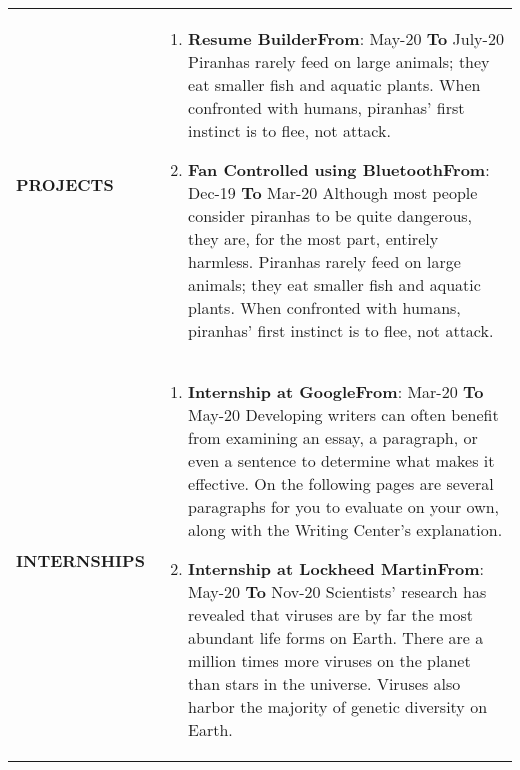 \documentclass{article}
\begin{document}
{\begin{longtable}{ p{3.5cm}|p{13.5cm} }
\\

{\textbf{\uppercase{Projects}}}&

\begin{enumerate}
	\item {\textbf{Resume Builder}}\hfill {\textbf{From}}: May-20 {\textbf{To}} July-20\newline
	Piranhas rarely feed on large animals; they eat smaller fish and aquatic plants. When confronted with humans, piranhas' first instinct is to flee, not attack. 
	\item {\textbf{Fan Controlled using Bluetooth}}\hfill {\textbf{From}}: Dec-19 {\textbf{To}} Mar-20\newline
	Although most people consider piranhas to be quite dangerous, they are, for the most part, entirely harmless. Piranhas rarely feed on large animals; they eat smaller fish and aquatic plants. When confronted with humans, piranhas' first instinct is to flee, not attack. 
	
\end{enumerate}

\\
{\textbf{\uppercase{Internships}}}&

\begin{enumerate}
	\item {\textbf{Internship at Google}}\hfill {\textbf{From}}: Mar-20 {\textbf{To}} May-20\newline
	Developing writers can often benefit from examining an essay, a paragraph, or even a sentence to determine what makes it effective. On the following pages are several paragraphs for you to evaluate on your own, along with the Writing Center's explanation.
	\item {\textbf{Internship at Lockheed Martin}}\hfill {\textbf{From}}: May-20 {\textbf{To}} Nov-20\newline
	 Scientists' research has revealed that viruses are by far the most abundant life forms on Earth. There are a million times more viruses on the planet than stars in the universe. Viruses also harbor the majority of genetic diversity on Earth. 
	 
	 
\end{enumerate}



\end{longtable} }
\end{document}
